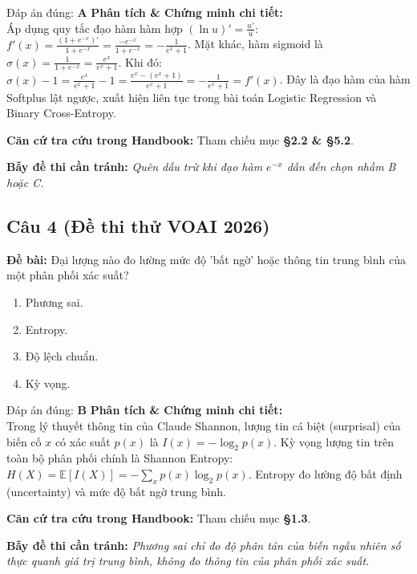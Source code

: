 \documentclass[10pt,a4paper]{article}
\begin{document}
\begin{solbox}{Đáp án đúng: \textbf{A}}
\textbf{Phân tích \& Chứng minh chi tiết:} \\
Áp dụng quy tắc đạo hàm hàm hợp $(\ln u)' = \frac{u'}{u}$: $f'(x) = \frac{(1 + e^{-x})'}{1 + e^{-x}} = \frac{-e^{-x}}{1 + e^{-x}} = -\frac{1}{e^x + 1}$. Mặt khác, hàm sigmoid là $\sigma(x) = \frac{1}{1 + e^{-x}} = \frac{e^x}{e^x + 1}$. Khi đó: $\sigma(x) - 1 = \frac{e^x}{e^x + 1} - 1 = \frac{e^x - (e^x + 1)}{e^x + 1} = -\frac{1}{e^x + 1} = f'(x)$. Đây là đạo hàm của hàm Softplus lật ngược, xuất hiện liên tục trong bài toán Logistic Regression và Binary Cross-Entropy.

\vspace{0.4em}
\textbf{Căn cứ tra cứu trong Handbook:} Tham chiếu mục \textbf{§2.2 \& §5.2}.

\vspace{0.4em}
\textbf{Bẫy đề thi cần tránh:} \textit{Quên dấu trừ khi đạo hàm $e^{-x}$ dẫn đến chọn nhầm B hoặc C.}
\end{solbox}
\vspace{0.5em}


\subsection*{Câu 4 (Đề thi thử VOAI 2026)}
\textbf{Đề bài:} Đại lượng nào đo lường mức độ 'bất ngờ' hoặc thông tin trung bình của một phân phối xác suất?

\begin{enumerate}[label=\textbf{\Alph*.}]
    \item Phương sai.
    \item Entropy.
    \item Độ lệch chuẩn.
    \item Kỳ vọng.
\end{enumerate}

\begin{solbox}{Đáp án đúng: \textbf{B}}
\textbf{Phân tích \& Chứng minh chi tiết:} \\
Trong lý thuyết thông tin của Claude Shannon, lượng tin cá biệt (surprisal) của biến cố $x$ có xác suất $p(x)$ là $I(x) = -\log_2 p(x)$. Kỳ vọng lượng tin trên toàn bộ phân phối chính là Shannon Entropy: $H(X) = \mathbb{E}[I(X)] = -\sum_{x} p(x) \log_2 p(x)$. Entropy đo lường độ bất định (uncertainty) và mức độ bất ngờ trung bình.

\vspace{0.4em}
\textbf{Căn cứ tra cứu trong Handbook:} Tham chiếu mục \textbf{§1.3}.

\vspace{0.4em}
\textbf{Bẫy đề thi cần tránh:} \textit{Phương sai chỉ đo độ phân tán của biến ngẫu nhiên số thực quanh giá trị trung bình, không đo thông tin của phân phối xác suất.}
\end{solbox}
\vspace{0.5em}
\end{document}
